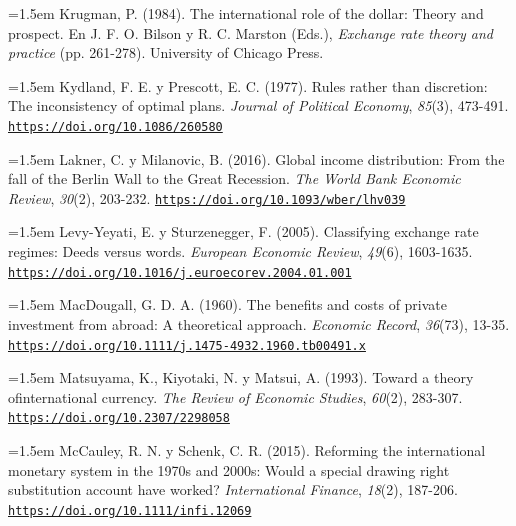 \documentclass[10pt,a4paper]{article}
\begin{document}
{\sloppy\noindent\hangindent=1.5em Krugman, P. (1984). The international role of the dollar: Theory and prospect. En J. F. O. Bilson y R. C. Marston (Eds.), \textit{Exchange rate theory and practice} (pp. 261-278). University of Chicago Press.\par}

{\sloppy\noindent\hangindent=1.5em Kydland, F. E. y Prescott, E. C. (1977). Rules rather than discretion: The inconsistency of optimal plans. \textit{Journal of Political Economy}, \textit{85}(3), 473-491. \href{https://doi.org/10.1086/260580}{\nolinkurl{https://doi.org/10.1086/260580}}\par}

{\sloppy\noindent\hangindent=1.5em Lakner, C. y Milanovic, B. (2016). Global income distribution: From the fall of the Berlin Wall to the Great Recession. \textit{The World Bank Economic Review}, \textit{30}(2), 203-232. \href{https://doi.org/10.1093/wber/lhv039}{\nolinkurl{https://doi.org/10.1093/wber/lhv039}}\par}

{\sloppy\noindent\hangindent=1.5em Levy-Yeyati, E. y Sturzenegger, F. (2005). Classifying exchange rate regimes: Deeds versus words. \textit{European Economic Review}, \textit{49}(6), 1603-1635. \href{https://doi.org/10.1016/j.euroecorev.2004.01.001}{\nolinkurl{https://doi.org/10.1016/j.euroecorev.2004.01.001}}\par}

{\sloppy\noindent\hangindent=1.5em MacDougall, G. D. A. (1960). The benefits and costs of private investment from abroad: A theoretical approach. \textit{Economic Record}, \textit{36}(73), 13-35. \href{https://doi.org/10.1111/j.1475-4932.1960.tb00491.x}{\nolinkurl{https://doi.org/10.1111/j.1475-4932.1960.tb00491.x}}\par}

{\sloppy\noindent\hangindent=1.5em Matsuyama, K., Kiyotaki, N. y Matsui, A. (1993). Toward a theory ofinternational currency. \textit{The Review of Economic Studies}, \textit{60}(2), 283-307. \href{https://doi.org/10.2307/2298058}{\nolinkurl{https://doi.org/10.2307/2298058}}\par}

{\sloppy\noindent\hangindent=1.5em McCauley, R. N. y Schenk, C. R. (2015). Reforming the international monetary system in the 1970s and 2000s: Would a special drawing right substitution account have worked? \textit{International Finance}, \textit{18}(2), 187-206. \href{https://doi.org/10.1111/infi.12069}{\nolinkurl{https://doi.org/10.1111/infi.12069}}\par}
\end{document}
